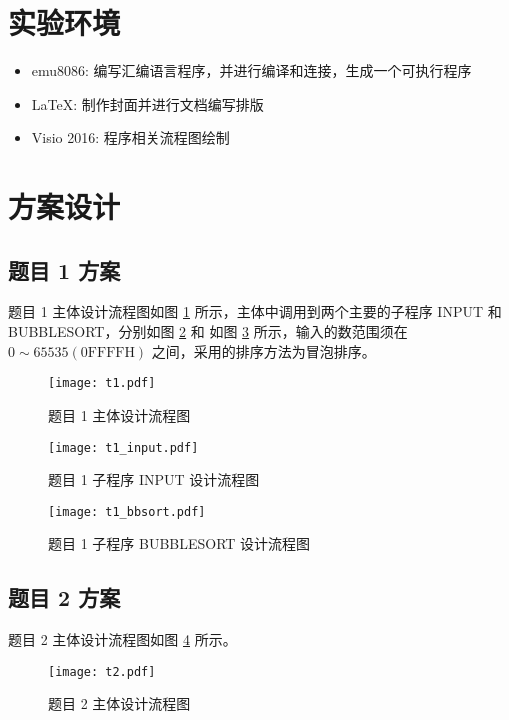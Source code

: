 \documentclass[12pt,AutoFakeBold]{article}
\begin{document}
\section{实验环境}

\begin{itemize}
	\item emu8086: 编写汇编语言程序，并进行编译和连接，生成一个可执行程序
	\item \LaTeX: 制作封面并进行文档编写排版
	\item Visio 2016: 程序相关流程图绘制
\end{itemize}

\section{方案设计}

\subsection{题目 1 方案}

题目 1 主体设计流程图如图 \ref{pro:t1} 所示，主体中调用到两个主要的子程序 INPUT 和 BUBBLESORT，分别如图 \ref{pro:t1_input} 和 如图 \ref{pro:t1_bbsort} 所示，输入的数范围须在 $0\sim65535(\mathrm{0FFFFH})$ 之间，采用的排序方法为冒泡排序。 

\begin{figure}[hbtp]
	\centering
	\texttt{[image: t1.pdf]}
	\caption{题目 1 主体设计流程图}\label{pro:t1}
\end{figure}

\begin{figure}[hbtp]
	\centering
	\texttt{[image: t1\_input.pdf]}
	\caption{题目 1 子程序 INPUT 设计流程图}\label{pro:t1_input}
\end{figure}

\begin{figure}[hbtp]
	\centering
	\texttt{[image: t1\_bbsort.pdf]}
	\caption{题目 1 子程序 BUBBLESORT 设计流程图}\label{pro:t1_bbsort}
\end{figure}

\subsection{题目 2 方案}

题目 2 主体设计流程图如图 \ref{pro:t2} 所示。

\begin{figure}[hbtp]
	\centering
	\texttt{[image: t2.pdf]}
	\caption{题目 2 主体设计流程图}\label{pro:t2}
\end{figure}
\end{document}

